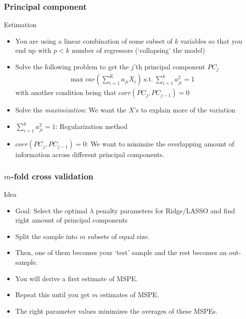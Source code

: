 \begin{frame}
\frametitle{Principal component}
Estimation
\begin{itemize}
\item You are using a linear combination of some subset of $k$ variables so that you end up with $p<k$ number of regressors (`collapsing' the model)
\item Solve the following problem to get the $j$'th principal component $PC_j$
\begin{align*}
\max var\left(\sum_{i=1}^Ka_{ji}X_{i}\right)\  \text{s.t.}\ \sum_{i=1}^ka_{ji}^{2}=1
\end{align*}
with another condition being that $corr(PC_j,PC_{j-1})=0$
\item Solve the \textit{maximization}: We want the $X$'s to explain more of the variation
\item $\sum_{i=1}^ka_{ji}^{2}=1$: Regularization method
\item $corr(PC_j,PC_{j-1})=0$: We want to minimize the overlapping amount of information across different principal components.
\end{itemize}
\end{frame}


\begin{frame}
\frametitle{$m$-fold cross validation}
Idea
\begin{itemize}
\item Goal: Select the optimal $\lambda$ penalty parameters for Ridge/LASSO and find right amount of principal components
\item Split the sample into $m$ subsets of equal size. 
\item Then, one of them becomes your `test' sample and the rest becomes an out-sample. 
\item You will derive a first estimate of MSPE. 
\item Repeat this until you get $m$ estimates of MSPE. 
\item The right parameter values minimizes the averages of these MSPEs. 
\end{itemize}
\end{frame}


